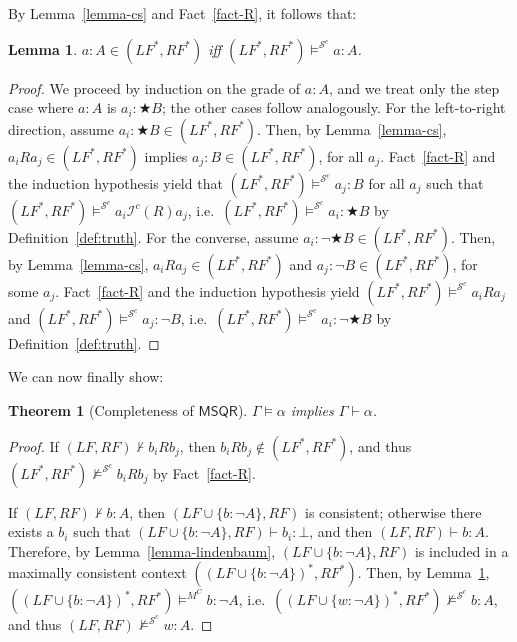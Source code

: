 \documentclass[times, 10pt]{article}
\newcommand{\MSQR}{\textsf{MSQR}}
\newtheorem{theorem}{Theorem}
\newtheorem{lemma}{Lemma}
\newcommand{\LF}{\mathit{LF}}
\newcommand{\RF}{\mathit{RF}}
\newcommand{\I}{\mathscr{I}}
\begin{document}
By Lemma~\ref{lemma-cs} and Fact~\ref{fact-R}, it follows that:
\begin{lemma}\label{lemma-truth}
  $a:A \in (\LF^*,\RF^*)$ iff $(\LF^*,\RF^*) \vDash^{\mathscr{S}^c} a:A$.
\end{lemma}
\begin{proof}
  We proceed by induction on the grade of $a:A$, and we treat only the step case where 
  $a:A$ is $a_i:\bigstar B$; the other cases follow analogously. For the left-to-right direction, 
  assume $a_i:\bigstar B \in (\LF^*,\RF^*)$.  Then, by Lemma~\ref{lemma-cs}, 
  $a_i R a_j \in (\LF^*,\RF^*)$ implies $a_j:B \in (\LF^*,\RF^*)$, for all $a_j$.
  Fact~\ref{fact-R} and the induction hypothesis yield that 
  $(\LF^*,\RF^*) \vDash^{\mathscr{S}^c} a_j:B$ for all 
  $a_j$ such that $(\LF^*,\RF^*) \vDash^{\mathscr{S}^c} a_i \I^c(R) a_j$, 
  i.e.~$(\LF^*,\RF^*) \vDash^{\mathscr{S}^c} a_i:\bigstar B$ by Definition~\ref{def:truth}.
  For the converse, assume $a_i:\neg \bigstar B \in (\LF^*,\RF^*)$.  Then, by
  Lemma~\ref{lemma-cs}, $a_i R a_j \in (\LF^*,\RF^*)$ and $a_j:\neg B \in (\LF^*,\RF^*)$, for 
  some $a_j$. Fact~\ref{fact-R} and the induction hypothesis yield
  $(\LF^*,\RF^*) \vDash^{\mathscr{S}^c} a_i R a_j$ and 
  $(\LF^*,\RF^*) \vDash^{\mathscr{S}^c} a_j:\neg B$, 
  i.e.~$(\LF^*,\RF^*) \vDash^{\mathscr{S}^c} a_i:\neg \bigstar B$ by Definition~\ref{def:truth}.
\end{proof}

We can now finally show:
\begin{theorem}[Completeness of $\MSQR$]\label{theorem:completeness-MSQR}
$\Gamma \vDash \alpha$ implies $\Gamma \vdash \alpha$.
\end{theorem}
\begin{proof}
  If $(\LF,\RF) \nvdash b_i R b_j$, then $b_i R b_j \not\in (\LF^*,\RF^*)$, and thus 
  $(\LF^*,\RF^*) \nvDash^{\mathscr{S}^c} b_i R b_j$ by Fact~\ref{fact-R}.  
  
  If $(\LF,\RF) \nvdash b:A$, then $(\LF \cup \{b:\neg A\},\RF)$ is consistent; otherwise
  there exists a $b_i$ such that $(\LF \cup \{b: \neg A\},\RF) \vdash b_i: \bot$, and then 
  $(\LF,\RF) \vdash b:A$. Therefore, by Lemma~\ref{lemma-lindenbaum}, 
  $(\LF \cup \{b: \neg A\},\RF)$ is included in a maximally consistent
  context $((\LF \cup \{b: \neg A\})^*,\RF^*)$.  Then, by
  Lemma~\ref{lemma-truth}, $((\LF \cup \{b: \neg A\})^*,\RF^*) \vDash^{M^C} b: \neg A$, 
  i.e.~$((\LF \cup\{w: \neg A\})^*,\RF^*) \nvDash^{\mathscr{S}^c} b:A$, and thus 
  $(\LF,\RF) \nvDash^{\mathscr{S}^c} w:A$.
\end{proof}
\end{document}
